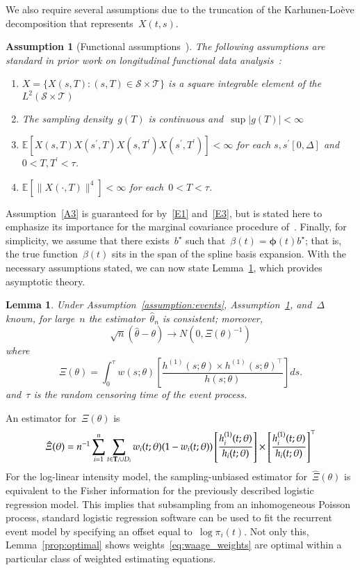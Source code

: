 \documentclass[12pt]{amsart}
\def\E{\mathcal{E}}
\newtheorem{lemma}[thm]{Lemma}
\newtheorem{assumption}[thm]{Assumption}
\def\E{\mathbb{E}}
\def\bfT{{\bf T}}
\begin{document}
We also require several assumptions due to the truncation of the
Karhunen-Lo{\`e}ve decomposition that represents~$X(t,s)$.
\begin{assumption}[Functional assumptions~\citep{Park2018}] \normalfont
\label{assumption:truncation}
The following assumptions are standard in prior work on longitudinal
functional data analysis~\citep{Park2018, Yao2005, ChenMuller2012}:
\begin{enumerate}[label=(A.\arabic*)]
\item\label{A1} $X = \{ X(s, T) : (s,T) \in \mathcal{S} \times
  \mathcal{T} \}$ is a square integrable element of the $L^2 (
  \mathcal{S} \times \mathcal{T})$
\item\label{A2} The sampling density~$g(T)$ is continuous
  and~$\sup |g(T)| < \infty$
\item\label{A3} $\E[X(s,T) X(s^\prime, T) X(s,T^\prime)
  X(s^\prime, T^\prime) ] < \infty$ for
  each $s,s^\prime [0,\Delta]$ and~$0 < T, T^\prime < \tau$.
\item\label{A4} $\E[\|X(\cdot, T)\|^4] < \infty$ for each~$0< T
  < \tau$.
\end{enumerate}
\end{assumption}
Assumption~\ref{A3} is guaranteed for by~\ref{E1} and~\ref{E3}, but is
stated here to emphasize its importance for the marginal covariance
procedure of~\cite{Park2018}.
Finally, for simplicity, we assume that there exists~$b^\star$
such that~$\beta(t) = \mathbold{\phi} (t) b^\star$; that is, the
true function~$\beta(t)$ sits in the span of the spline basis
expansion. 
With the necessary assumptions stated, we can now state
Lemma~\ref{lemma:simpleasym}, which provides asymptotic theory.
\begin{lemma} \normalfont
\label{lemma:simpleasym}
Under Assumption~\ref{assumption:events},
Assumption~\ref{assumption:truncation}, and~$\Delta$ known, for
large~$n$ the estimator~$\hat \theta_n$ is consistent; moreover,
\[
\sqrt{n} (\hat \theta - \theta) \to N(0, \Xi (\theta)^{-1})
\]
where
\[
  \Xi (\theta) = \int_{0}^{\tau} w(s; \theta) \left[ \frac{h^{(1)}(s;
      \theta) \times  h^{(1)} (s;\theta)^{\top}}{h(s; \theta)} \right]
  ds.
\]
and~$\tau$ is the random censoring time of the event process.
\end{lemma}
An estimator for~$\Xi(\theta)$ is
\begin{equation}
\label{eq:fisher}
  \hat \Xi (\theta) = n^{-1} \sum_{i=1}^n \sum_{t \in \bfT_i \cup D_i} 
  w_i(t;\theta) (1-w_i(t;\theta)) \left[ \frac{h_i^{(1)}(t;
      \theta)}{h_i (t; \theta)} \right] \times  \left [
    \frac{h_i^{(1)} (t;\theta)}{h_i(t; \theta)} \right]^\top
\end{equation}
For the log-linear intensity model, the sampling-unbiased estimator
for~$\hat \Xi(\theta)$ is equivalent to the Fisher information for the
previously described logistic regression model.
This implies that subsampling from an inhomogeneous Poisson process,
standard logistic regression software can be used to fit the recurrent
event model by specifying an offset equal to~$\log \pi_i (t)$.
Not only this, Lemma~\ref{prop:optimal} shows
weights~\eqref{eq:waage_weights} are optimal within a particular class
of weighted estimating equations. 
\end{document}
